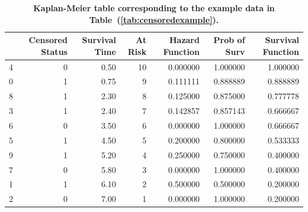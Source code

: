 \documentclass[10pt,letterpaper]{article}
\begin{document}
\begin{table}[!ht]
\begin{adjustwidth}{-2.25in}{0in} %
\caption{\label{tab:kaplanexample} {\bf Kaplan-Meier table corresponding to the example data in Table~(\ref{tab:censoredexample}).}}
\begin{tabular}{lrrrrrr}
\toprule
{} &  Censored Status &  Survival Time &  At Risk &  Hazard Function &  Prob of Surv & Survival Function \\
\midrule
4 &                0 &            0.50 &              10 &       0.000000 &      1.000000 &      1.000000 \\
0 &                1 &            0.75 &               9 &       0.111111 &      0.888889 &      0.888889 \\
8 &                1 &            2.30 &               8 &       0.125000 &      0.875000 &      0.777778 \\
3 &                1 &            2.40 &               7 &       0.142857 &      0.857143 &      0.666667 \\
6 &                0 &            3.50 &               6 &       0.000000 &      1.000000 &      0.666667 \\
5 &                1 &            4.50 &               5 &       0.200000 &      0.800000 &      0.533333 \\
9 &                1 &            5.20 &               4 &       0.250000 &      0.750000 &      0.400000 \\
7 &                0 &            5.80 &               3 &       0.000000 &      1.000000 &      0.400000 \\
1 &                1 &            6.10 &               2 &       0.500000 &      0.500000 &      0.200000 \\
2 &                0 &            7.00 &               1 &       0.000000 &      1.000000 &      0.200000 \\
\bottomrule
\end{tabular}
\end{adjustwidth}
\end{table}
\end{document}
